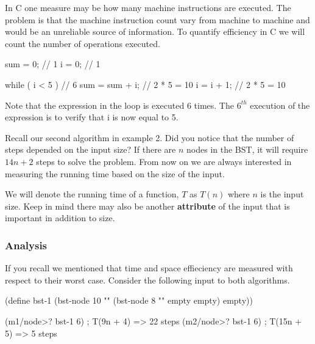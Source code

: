 In C one measure may be how many machine instructions are executed. The problem is that the machine instruction count vary from machine to machine and would be an unreliable source of information. To quantify efficiency in C we will count the number of operations executed.\\

\begin{code}[c]
sum = 0;               // 1
i = 0;                 // 1

while ( i < 5 ) {      // 6
  sum = sum + i;       // 2 * 5 = 10
  i = i + 1;           // 2 * 5 = 10
}
\end{code}

Note that the expression in the loop is executed 6 times. The $6^{th}$ execution of the expression is to verify that i is now equal to 5.


Recall our second algorithm in example 2. Did you notice that the number of steps depended on the input size? If there are $n$ nodes in the BST, it will require $14n + 2$ steps to solve the problem. From now on we are always interested in measuring the running time based on the size of the input.\\


We will denote the running time of a function, $T$ as $T(n)$ where $n$ is the input size. Keep in mind there may also be another \textbf{attribute} of the input that is important in addition to size.\\

\subsubsection*{Analysis}

If you recall we mentioned that time and space effieciency are measured with respect to their worst case. Consider the following input to both algorithms.\\

\begin{code}[Lisp]
(define bst-1 (bst-node 10 "" (bst-node 8 "" empty empty) empty))

(m1/node>? bst-1 6) ; T(9n + 4) => 22 steps
(m2/node>? bst-1 6) ; T(15n + 5) => 5 steps
\end{code}

